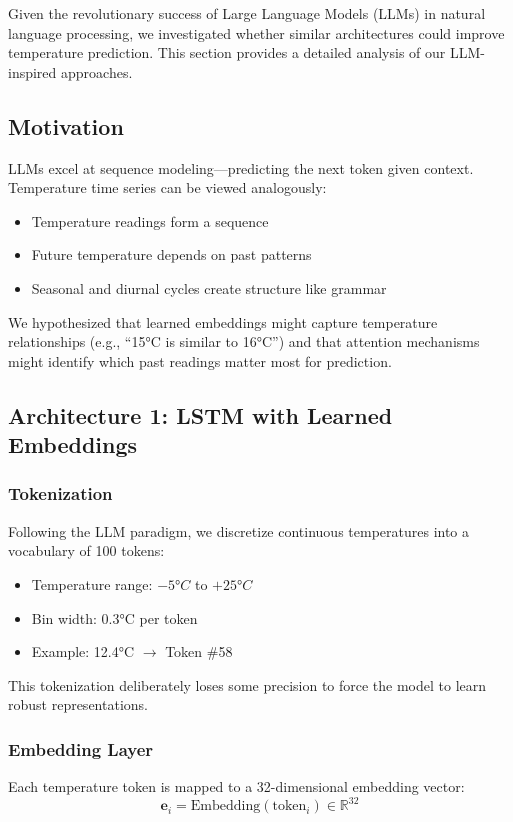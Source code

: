 \documentclass[11pt,letterpaper]{article}
\begin{document}
Given the revolutionary success of Large Language Models (LLMs) in natural language processing, we investigated whether similar architectures could improve temperature prediction. This section provides a detailed analysis of our LLM-inspired approaches.

\subsection{Motivation}

LLMs excel at sequence modeling---predicting the next token given context. Temperature time series can be viewed analogously:
\begin{itemize}
    \item Temperature readings form a sequence
    \item Future temperature depends on past patterns
    \item Seasonal and diurnal cycles create structure like grammar
\end{itemize}

We hypothesized that learned embeddings might capture temperature relationships (e.g., ``15°C is similar to 16°C'') and that attention mechanisms might identify which past readings matter most for prediction.

\subsection{Architecture 1: LSTM with Learned Embeddings}

\subsubsection{Tokenization}
Following the LLM paradigm, we discretize continuous temperatures into a vocabulary of 100 tokens:
\begin{itemize}
    \item Temperature range: $-5°C$ to $+25°C$
    \item Bin width: 0.3°C per token
    \item Example: 12.4°C $\rightarrow$ Token \#58
\end{itemize}

This tokenization deliberately loses some precision to force the model to learn robust representations.

\subsubsection{Embedding Layer}
Each temperature token is mapped to a 32-dimensional embedding vector:
\begin{equation}
    \mathbf{e}_i = \text{Embedding}(\text{token}_i) \in \mathbb{R}^{32}
\end{equation}
\end{document}
